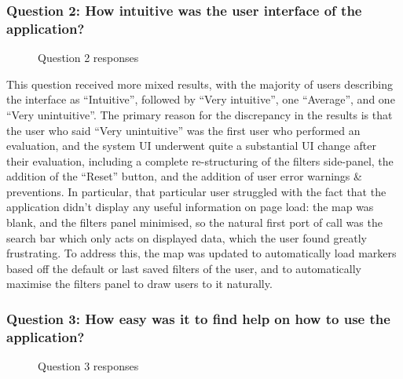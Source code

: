\documentclass[a4paper,11pt]{report}
\begin{document}
\subsubsection{Question 2: How intuitive was the user interface of the application?}
\begin{figure}[H]
    \centering
    \caption{Question 2 responses}
\end{figure}

This question received more mixed results, with the majority of users describing the interface as ``Intuitive'', followed by ``Very intuitive'', one ``Average'', and one ``Very unintuitive''.
The primary reason for the discrepancy in the results is that the user who said ``Very unintuitive'' was the first user who performed an evaluation, and the system UI underwent quite a substantial UI change after their evaluation, including a complete re-structuring of the filters side-panel, the addition of the ``Reset'' button, and the addition of user error warnings \& preventions.
In particular, that particular user struggled with the fact that the application didn't display any useful information on page load: the map was blank, and the filters panel minimised, so the natural first port of call was the search bar which only acts on displayed data, which the user found greatly frustrating.
To address this, the map was updated to automatically load markers based off the default or last saved filters of the user, and to automatically maximise the filters panel to draw users to it naturally.

\subsubsection{Question 3: How easy was it to find help on how to use the application?}
\begin{figure}[H]
    \centering
    \caption{Question 3 responses}
\end{figure}
\end{document}
